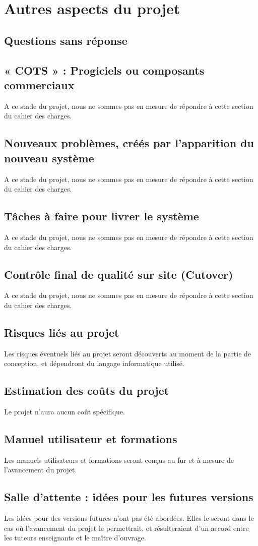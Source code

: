 	\chapter{Autres aspects du projet}
		\section{Questions sans réponse}
		
		\section{« COTS » : Progiciels ou composants commerciaux}
		A ce stade du projet, nous ne sommes pas en mesure de répondre à cette section du cahier des charges. 

		\section{Nouveaux problèmes, créés par l’apparition du nouveau système}
		A ce stade du projet, nous ne sommes pas en mesure de répondre à cette section du cahier des charges. 

		\section{Tâches à faire pour livrer le système}
		A ce stade du projet, nous ne sommes pas en mesure de répondre à cette section du cahier des charges. 

		\section{Contrôle final de qualité sur site (Cutover)}
		A ce stade du projet, nous ne sommes pas en mesure de répondre à cette section du cahier des charges. 

		\section{Risques liés au projet}
		Les risques éventuels liés au projet seront découverts au moment de la partie de conception, et dépendront du langage informatique utilisé. 

		\section{Estimation des coûts du projet}
		Le projet n'aura aucun coût spécifique. 

		\section{Manuel utilisateur et formations}
		Les manuels utilisateurs et formations seront conçus au fur et à mesure de l'avancement du projet. 

		\section{Salle d’attente : idées pour les futures versions}
		Les idées pour des versions futures n'ont pas été abordées. Elles le seront dans le cas où l'avancement du projet le permettrait, et résulteraient d'un accord entre les tuteurs enseignants et le maître d'ouvrage.